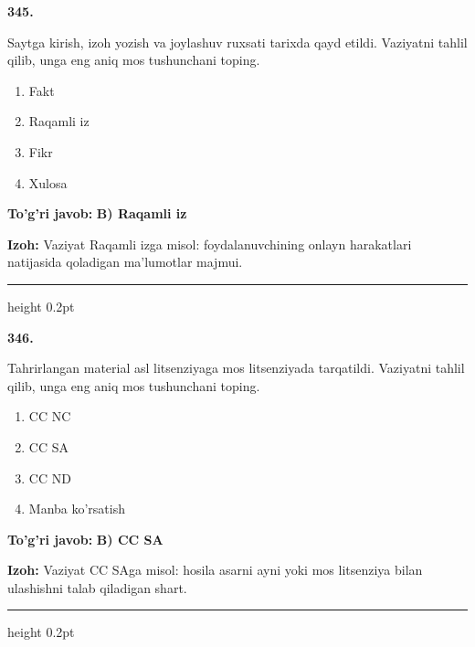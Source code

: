 \documentclass[10pt,a4paper,oneside]{article}
\begin{document}
\noindent\textbf{\color{ink}345.}
\par
Saytga kirish, izoh yozish va joylashuv ruxsati tarixda qayd etildi. Vaziyatni tahlil qilib, unga eng aniq mos tushunchani toping.
\begin{enumerate}[label=\Alph*),leftmargin=9mm]
\item Fakt
\item Raqamli iz
\item Fikr
\item Xulosa
\end{enumerate}
\begin{tcolorbox}[enhanced,breakable,colback=teal!4,colframe=teal!50!black,boxrule=0.5pt,arc=1.1mm,left=3mm,right=3mm,top=1.7mm,bottom=1.7mm,before skip=2mm,after skip=2mm]
\textbf{\color{teal}To'g'ri javob:} \textbf{B) Raqamli iz}
\par\smallskip
\textbf{Izoh:} Vaziyat Raqamli izga misol: foydalanuvchining onlayn harakatlari natijasida qoladigan ma'lumotlar majmui.
\end{tcolorbox}
\vspace{2mm}\hrule height 0.2pt \vspace{3mm}

\noindent\textbf{\color{ink}346.}
\par
Tahrirlangan material asl litsenziyaga mos litsenziyada tarqatildi. Vaziyatni tahlil qilib, unga eng aniq mos tushunchani toping.
\begin{enumerate}[label=\Alph*),leftmargin=9mm]
\item CC NC
\item CC SA
\item CC ND
\item Manba ko'rsatish
\end{enumerate}
\begin{tcolorbox}[enhanced,breakable,colback=teal!4,colframe=teal!50!black,boxrule=0.5pt,arc=1.1mm,left=3mm,right=3mm,top=1.7mm,bottom=1.7mm,before skip=2mm,after skip=2mm]
\textbf{\color{teal}To'g'ri javob:} \textbf{B) CC SA}
\par\smallskip
\textbf{Izoh:} Vaziyat CC SAga misol: hosila asarni ayni yoki mos litsenziya bilan ulashishni talab qiladigan shart.
\end{tcolorbox}
\vspace{2mm}\hrule height 0.2pt \vspace{3mm}
\end{document}
